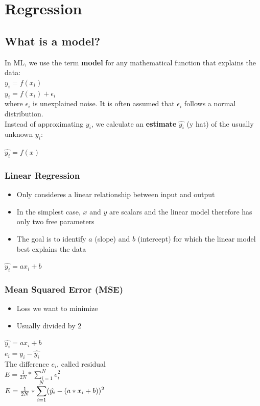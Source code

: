 \section{Regression}
\subsection{What is a model?}
In ML, we use the term \textbf{model} for any mathematical function that explains the data:\\ 
$y_i = f(x_i)$\\ 
$y_i = f(x_i) + \epsilon_i$\\ 
where $\epsilon_i$ is unexplained noise. It is often assumed that $\epsilon_i$ follows a normal distribution.\\ 
Instead of approximating $y_i$, we calculate an \textbf{estimate} $\hat{y_i}$ (y hat) of the usually unknown $y_i$: \\
\begin{center}
    $\hat{y_i} = f(x)$
\end{center}

\subsubsection{Linear Regression}
\begin{itemize}
    \item Only consideres a linear relationship between input and output
    \item In the simplest case, $x$ and $y$ are scalars and the linear model therefore has only two free parameters
    \item The goal is to identify $a$ (slope) and $b$ (intercept) for which the linear model best explains the data
\end{itemize}
\begin{center}
    $\hat{y_i} = ax_i + b$\\
\end{center}

\subsubsection{Mean Squared Error (MSE)}
\begin{itemize}
    \item Loss we want to minimize
    \item Usually divided by 2
\end{itemize}
\begin{center}
    $\hat{y_i} = ax_i + b$\\ 
    $e_i = y_i - \hat{y_i}$ \\ 
    The difference $e_i$, called residual\\ 
    $E = \frac{1}{2N} * \displaystyle\sum_{i = 1}^{N} e_i^2$\\
    $E = \frac{1}{2N} * \large\displaystyle\sum_{i = 1}^{N}(\hat{y_i} - (a*x_i + b))^2$
\end{center}

